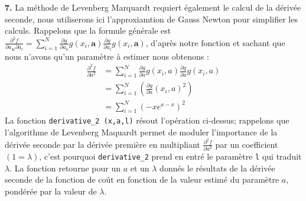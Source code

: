 \documentclass[12pt]{article}
\begin{document}
\textbf{\color{brick}7.} La méthode de Levenberg Marquardt requiert également le calcul de la dérivée seconde, nous utiliserons ici l'approxiamtion de Gauss Newton pour simplifier les calculs. Rappelons que la formule générale est $\frac{\partial ^2 f }{\partial a_K \partial a_l} = \sum_{i=1}^N \frac{\partial g}{\partial a_k}g(x_i, \textbf{a})\frac{\partial g}{\partial a_l}g(x_i, \textbf{a})$, d'après notre fonction et sachant que nous n'avons qu'un paramètre à estimer nous obtenons :\\ 
\begin{align*}
    \frac{\partial ^2 f }{\partial a ^2} &=  \sum_{i=1}^N \frac{\partial g}{\partial a}g(x_i, a)\frac{\partial g}{\partial a}g(x_i, a)\\
    &= \sum_{i=1}^N ( \frac{\partial g}{\partial a}(x_i, a)^2) \\
    &=  \sum_{i=1}^N (-xe^{a-x})^2
\end{align*}
La fonction \verb|derivative_2 (x,a,l)| résout l'opération ci-dessus; rappelons que l'algorithme de Levenberg Maquardt permet de moduler l'importance de la dérivée seconde par la dérivée première en multipliant $ \frac{\partial ^2 f }{\partial a ^2} $ par un coefficient $(1= \lambda)$, c'est pourquoi  \verb|derivative_2| prend en entré le paramètre \verb|l| qui traduit $\lambda$. La fonction  retourne pour un $a$ et un $\lambda$ donnés le résultats de la dérivée seconde de la fonction de coût en fonction de la valeur estimé du paramètre $a$, pondérée par la valeur de $\lambda$.
\end{document}

